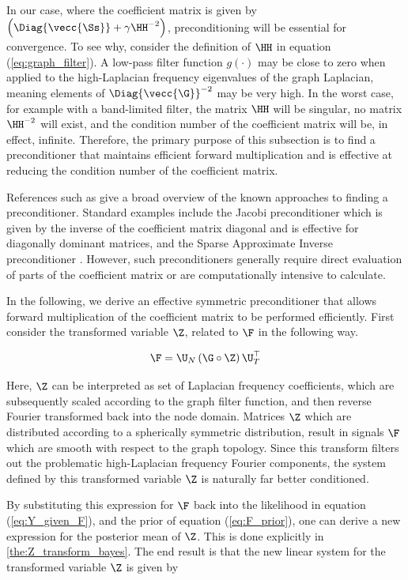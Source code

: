 In our case, where the coefficient matrix is given by $\Big(\Diag{\vecc{\Ss}} + \gamma  \HH^{-2}\Big)$, preconditioning will be essential for convergence. To see why, consider the definition of $\HH$ in equation (\ref{eq:graph_filter}). A low-pass filter function $g(\cdot)$ may be close to zero when applied to the  high-Laplacian frequency eigenvalues of the graph Laplacian, meaning elements of $\Diag{\vecc{\G}}^{-2}$ may be very high. In the worst case, for example with a band-limited filter, the matrix $\HH$ will be singular, no matrix $\HH^{-2}$ will exist, and the condition number of the coefficient matrix will be, in effect, infinite. Therefore, the primary purpose of this subsection is to find a preconditioner that maintains efficient forward multiplication and is effective at reducing the condition number of the coefficient matrix.

References such as \citep{Saad2003} give a broad overview of the known approaches to finding a preconditioner. Standard examples include the Jacobi preconditioner which is given by the inverse of the coefficient matrix diagonal and is effective for diagonally dominant matrices, and the Sparse Approximate Inverse preconditioner \citep{Grote1997}. However, such preconditioners generally require direct evaluation of parts of the coefficient matrix or are computationally intensive to calculate.

In the following, we derive an effective symmetric preconditioner that allows forward multiplication of the coefficient matrix to be performed efficiently. First consider the transformed variable $\Z$, related to $\F$ in the following way.

\begin{equation}
    \label{eq:Z_transform}
    \F = \U_N \, (\G \circ \Z) \, \U_T^\top
\end{equation}

Here, $\Z$ can be interpreted as set of Laplacian frequency coefficients, which are subsequently scaled according to the graph filter function, and then reverse Fourier transformed back into the node domain. Matrices $\Z$ which are distributed according to a spherically symmetric distribution, result in signals $\F$ which are smooth with respect to the graph topology. Since this transform filters out the problematic high-Laplacian frequency Fourier components, the system defined by this transformed variable $\Z$ is naturally far better conditioned.

By substituting this expression for $\F$ back into the likelihood in equation (\ref{eq:Y_given_F}), and the prior of equation (\ref{eq:F_prior}), one can derive a new expression for the posterior mean of $\Z$. This is done explicitly in \cref{the:Z_transform_bayes}. The end result is that the new linear system for the transformed variable $\Z$ is given by


